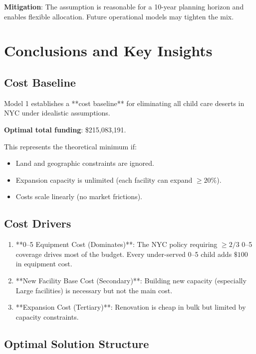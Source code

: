 \documentclass[12pt]{article}
\begin{document}
\textbf{Mitigation}: The assumption is reasonable for a 10-year planning horizon and enables flexible allocation. 
Future operational models may tighten the mix.

\section{Conclusions and Key Insights}

\subsection{Cost Baseline}

Model 1 establishes a **cost baseline** for eliminating all child care deserts in NYC under idealistic assumptions.

\noindent
\textbf{Optimal total funding}: \$215,083,191.

\noindent
This represents the theoretical minimum if:
\begin{itemize}
    \item Land and geographic constraints are ignored.
    \item Expansion capacity is unlimited (each facility can expand $\geq 20\%$).
    \item Costs scale linearly (no market frictions).
\end{itemize}

\subsection{Cost Drivers}

\begin{enumerate}
    \item **0--5 Equipment Cost (Dominates)**: The NYC policy requiring $\geq 2/3$ 0--5 coverage drives most of the budget. 
    Every under-served 0--5 child adds $\$100$ in equipment cost.
    
    \item **New Facility Base Cost (Secondary)**: Building new capacity (especially Large facilities) is necessary 
    but not the main cost.
    
    \item **Expansion Cost (Tertiary)**: Renovation is cheap in bulk but limited by capacity constraints.
\end{enumerate}

\subsection{Optimal Solution Structure}
\end{document}
